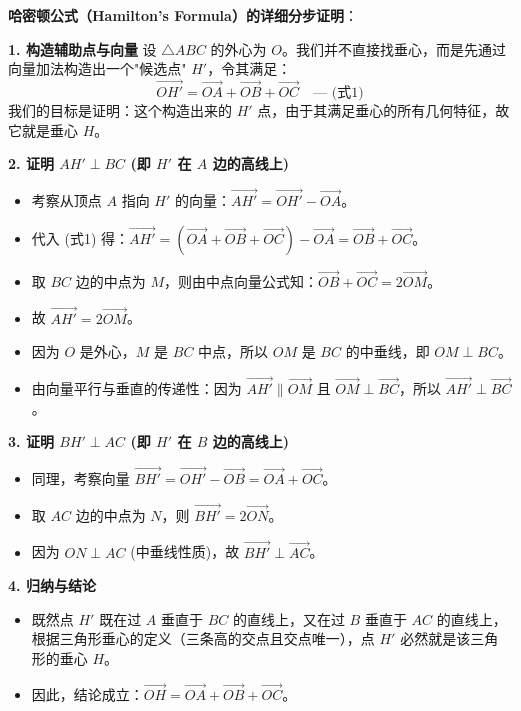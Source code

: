 \begin{proofbox}
\textbf{哈密顿公式（Hamilton's Formula）的详细分步证明}：

\textbf{1. 构造辅助点与向量}
设 $\triangle ABC$ 的外心为 $O$。我们并不直接找垂心，而是先通过向量加法构造出一个"候选点" $H'$，令其满足：
\[ \vec{OH'} = \vec{OA} + \vec{OB} + \vec{OC} \quad \text{--- (式1)} \]
我们的目标是证明：这个构造出来的 $H'$ 点，由于其满足垂心的所有几何特征，故它就是垂心 $H$。

\textbf{2. 证明 $AH' \perp BC$ (即 $H'$ 在 $A$ 边的高线上)}
\begin{itemize}
    \item 考察从顶点 $A$ 指向 $H'$ 的向量：$\vec{AH'} = \vec{OH'} - \vec{OA}$。
    \item 代入 (式1) 得：$\vec{AH'} = (\vec{OA} + \vec{OB} + \vec{OC}) - \vec{OA} = \vec{OB} + \vec{OC}$。
    \item 取 $BC$ 边的中点为 $M$，则由中点向量公式知：$\vec{OB} + \vec{OC} = 2\vec{OM}$。
    \item 故 $\vec{AH'} = 2\vec{OM}$。
    \item 因为 $O$ 是外心，$M$ 是 $BC$ 中点，所以 $OM$ 是 $BC$ 的中垂线，即 $OM \perp BC$。
    \item 由向量平行与垂直的传递性：因为 $\vec{AH'} \parallel \vec{OM}$ 且 $\vec{OM} \perp \vec{BC}$，所以 $\vec{AH'} \perp \vec{BC}$。
\end{itemize}



\textbf{3. 证明 $BH' \perp AC$ (即 $H'$ 在 $B$ 边的高线上)}
\begin{itemize}
    \item 同理，考察向量 $\vec{BH'} = \vec{OH'} - \vec{OB} = \vec{OA} + \vec{OC}$。
    \item 取 $AC$ 边的中点为 $N$，则 $\vec{BH'} = 2\vec{ON}$。
    \item 因为 $ON \perp AC$ (中垂线性质)，故 $\vec{BH'} \perp \vec{AC}$。
\end{itemize}

\textbf{4. 归纳与结论}
\begin{itemize}
    \item 既然点 $H'$ 既在过 $A$ 垂直于 $BC$ 的直线上，又在过 $B$ 垂直于 $AC$ 的直线上，根据三角形垂心的定义（三条高的交点且交点唯一），点 $H'$ 必然就是该三角形的垂心 $H$。
    \item 因此，结论成立：$\vec{OH} = \vec{OA} + \vec{OB} + \vec{OC}$。
\end{itemize}
\end{proofbox}


